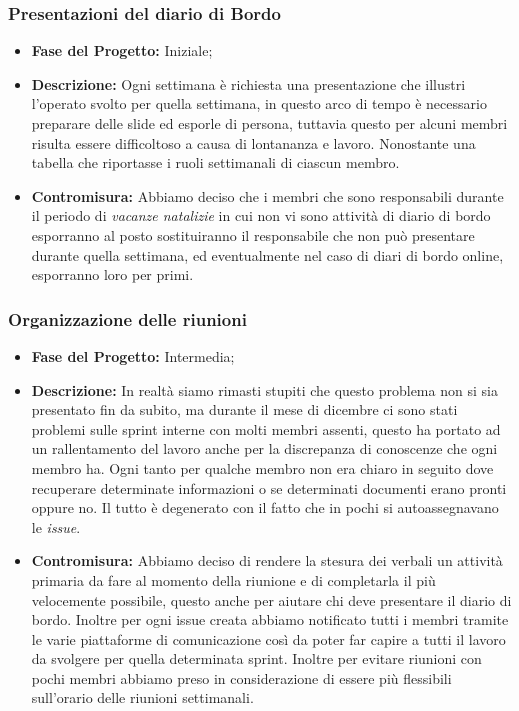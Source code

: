 \documentclass{article}
\begin{document}
\subsubsection{Presentazioni del diario di Bordo}
\begin{itemize}
    \item \textbf{Fase del Progetto:} Iniziale;
    \item \textbf{Descrizione:} Ogni settimana è richiesta una presentazione che illustri l'operato svolto per quella settimana, in questo arco di tempo è necessario preparare delle slide ed esporle di persona, tuttavia questo per alcuni membri risulta essere difficoltoso a causa di lontananza e lavoro. Nonostante una tabella che riportasse i ruoli settimanali di ciascun membro.
    \item \textbf{Contromisura:} Abbiamo deciso che i membri che sono responsabili durante il periodo di \textit{vacanze natalizie} in cui non vi sono attività di diario di bordo esporranno al posto sostituiranno il responsabile che non può presentare durante quella settimana, ed eventualmente nel caso di diari di bordo online, esporranno loro per primi.
\end{itemize}
\subsubsection{Organizzazione delle riunioni}
\begin{itemize}
    \item \textbf{Fase del Progetto:} Intermedia;
    \item \textbf{Descrizione:} In realtà siamo rimasti stupiti che questo problema non si sia presentato fin da subito, ma durante il mese di dicembre ci sono stati problemi sulle sprint interne con molti membri assenti, questo ha portato ad un rallentamento del lavoro anche per la discrepanza di conoscenze che ogni membro ha. Ogni tanto per qualche membro non era chiaro in seguito dove recuperare determinate informazioni o se determinati documenti erano pronti oppure no. Il tutto è degenerato con il fatto che in pochi si autoassegnavano le \textit{issue}.
    \item \textbf{Contromisura:} Abbiamo deciso di rendere la stesura dei verbali un attività primaria da fare al momento della riunione e di completarla il più velocemente possibile, questo anche per aiutare chi deve presentare il diario di bordo. Inoltre per ogni issue creata abbiamo notificato tutti i membri tramite le varie piattaforme di comunicazione così da poter far capire a tutti il lavoro da svolgere per quella determinata sprint. Inoltre per evitare riunioni con pochi membri abbiamo preso in considerazione di essere più flessibili sull'orario delle riunioni settimanali.
\end{itemize}
\end{document}
